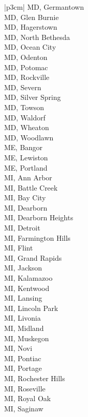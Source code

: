 \begin{customLongTable}{ |p{3cm}| }
MD, Germantown \\ \hline
MD, Glen Burnie \\ \hline
MD, Hagerstown \\ \hline
MD, North Bethesda \\ \hline
MD, Ocean City \\ \hline
MD, Odenton \\ \hline
MD, Potomac \\ \hline
MD, Rockville \\ \hline
MD, Severn \\ \hline
MD, Silver Spring \\ \hline
MD, Towson \\ \hline
MD, Waldorf \\ \hline
MD, Wheaton \\ \hline
MD, Woodlawn \\ \hline
ME, Bangor \\ \hline
ME, Lewiston \\ \hline
ME, Portland \\ \hline
MI, Ann Arbor \\ \hline
MI, Battle Creek \\ \hline
MI, Bay City \\ \hline
MI, Dearborn \\ \hline
MI, Dearborn Heights \\ \hline
MI, Detroit \\ \hline
MI, Farmington Hills \\ \hline
MI, Flint \\ \hline
MI, Grand Rapids \\ \hline
MI, Jackson \\ \hline
MI, Kalamazoo \\ \hline
MI, Kentwood \\ \hline
MI, Lansing \\ \hline
MI, Lincoln Park \\ \hline
MI, Livonia \\ \hline
MI, Midland \\ \hline
MI, Muskegon \\ \hline
MI, Novi \\ \hline
MI, Pontiac \\ \hline
MI, Portage \\ \hline
MI, Rochester Hills \\ \hline
MI, Roseville \\ \hline
MI, Royal Oak \\ \hline
MI, Saginaw \\ \hline

\end{customLongTable}
